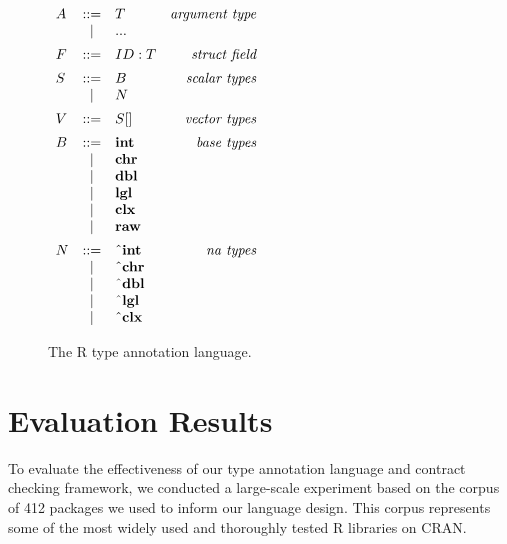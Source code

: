\documentclass[acmsmall,review,anonymous]{acmart}\settopmatter{printfolios=true,printccs=false,printacmref=false}
\begin{document}
\begin{figure}
    \hfill
    \begin{minipage}{.45\linewidth}
    \begin{flushright}
    $ \begin{array}{lclr}
    A & ::= & T & \text{\it argument type} \\
      & |   & {\bf ...} \vspace{5pt} \\
    F & ::= & ID : T & \text{\it struct field}\vspace{5pt}\\
    S & ::= & B & \text{\it scalar types} \\
      & |   & N \vspace{5pt}\\
    V & ::= & S \lbrack \rbrack & \text{\it vector types} \vspace{5pt}\\
    B & ::= & {\bf int} & \text{\it base types} \\
      & |   & {\bf chr} \\
      & |   & {\bf dbl} \\
      & |   & {\bf lgl} \\
      & |   & {\bf clx} \\
      & |   & {\bf raw} \vspace{5pt}\\
    N & ::= & {\bf \string^int} & \text{\it na types} \\
      & |   & {\bf \string^chr} \\
      & |   & {\bf \string^dbl} \\
      & |   & {\bf \string^lgl} \\
      & |   & {\bf \string^clx} \\
\end{array} $
    \end{flushright}
    \end{minipage}
    \caption{The R type annotation language.}
    \label{fig:types}
\end{figure}

%
%
%
%
%
%
\section{Evaluation Results}
\label{sec:evaluation}

To evaluate the effectiveness of our type annotation language and contract checking framework, we conducted a large-scale experiment based on the corpus of 412 packages we used to inform our language design.
This corpus represents some of the most widely used and thoroughly tested R libraries on CRAN.
\end{document}
